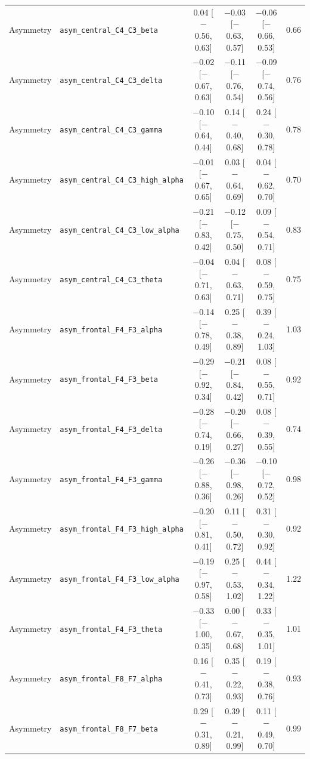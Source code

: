 {\begin{longtable}{llcccc}
Asymmetry & \texttt{asym\_central\_C4\_C3\_beta} & 0.04 [$-$0.56, 0.63] & $-$0.03 [$-$0.63, 0.57] & $-$0.06 [$-$0.66, 0.53] & 0.66 \\
Asymmetry & \texttt{asym\_central\_C4\_C3\_delta} & $-$0.02 [$-$0.67, 0.63] & $-$0.11 [$-$0.76, 0.54] & $-$0.09 [$-$0.74, 0.56] & 0.76 \\
Asymmetry & \texttt{asym\_central\_C4\_C3\_gamma} & $-$0.10 [$-$0.64, 0.44] & 0.14 [$-$0.40, 0.68] & 0.24 [$-$0.30, 0.78] & 0.78 \\
Asymmetry & \texttt{asym\_central\_C4\_C3\_high\_alpha} & $-$0.01 [$-$0.67, 0.65] & 0.03 [$-$0.64, 0.69] & 0.04 [$-$0.62, 0.70] & 0.70 \\
Asymmetry & \texttt{asym\_central\_C4\_C3\_low\_alpha} & $-$0.21 [$-$0.83, 0.42] & $-$0.12 [$-$0.75, 0.50] & 0.09 [$-$0.54, 0.71] & 0.83 \\
Asymmetry & \texttt{asym\_central\_C4\_C3\_theta} & $-$0.04 [$-$0.71, 0.63] & 0.04 [$-$0.63, 0.71] & 0.08 [$-$0.59, 0.75] & 0.75 \\
Asymmetry & \texttt{asym\_frontal\_F4\_F3\_alpha} & $-$0.14 [$-$0.78, 0.49] & 0.25 [$-$0.38, 0.89] & 0.39 [$-$0.24, 1.03] & 1.03 \\
Asymmetry & \texttt{asym\_frontal\_F4\_F3\_beta} & $-$0.29 [$-$0.92, 0.34] & $-$0.21 [$-$0.84, 0.42] & 0.08 [$-$0.55, 0.71] & 0.92 \\
Asymmetry & \texttt{asym\_frontal\_F4\_F3\_delta} & $-$0.28 [$-$0.74, 0.19] & $-$0.20 [$-$0.66, 0.27] & 0.08 [$-$0.39, 0.55] & 0.74 \\
Asymmetry & \texttt{asym\_frontal\_F4\_F3\_gamma} & $-$0.26 [$-$0.88, 0.36] & $-$0.36 [$-$0.98, 0.26] & $-$0.10 [$-$0.72, 0.52] & 0.98 \\
Asymmetry & \texttt{asym\_frontal\_F4\_F3\_high\_alpha} & $-$0.20 [$-$0.81, 0.41] & 0.11 [$-$0.50, 0.72] & 0.31 [$-$0.30, 0.92] & 0.92 \\
Asymmetry & \texttt{asym\_frontal\_F4\_F3\_low\_alpha} & $-$0.19 [$-$0.97, 0.58] & 0.25 [$-$0.53, 1.02] & 0.44 [$-$0.34, 1.22] & 1.22 \\
Asymmetry & \texttt{asym\_frontal\_F4\_F3\_theta} & $-$0.33 [$-$1.00, 0.35] & 0.00 [$-$0.67, 0.68] & 0.33 [$-$0.35, 1.01] & 1.01 \\
Asymmetry & \texttt{asym\_frontal\_F8\_F7\_alpha} & 0.16 [$-$0.41, 0.73] & 0.35 [$-$0.22, 0.93] & 0.19 [$-$0.38, 0.76] & 0.93 \\
Asymmetry & \texttt{asym\_frontal\_F8\_F7\_beta} & 0.29 [$-$0.31, 0.89] & 0.39 [$-$0.21, 0.99] & 0.11 [$-$0.49, 0.70] & 0.99 \\

\end{longtable}}

